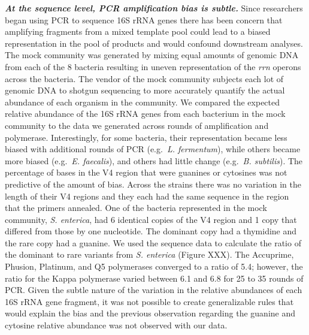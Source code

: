 \documentclass[11pt,]{article}
\begin{document}
\textbf{\emph{At the sequence level, PCR amplification bias is subtle.}}
Since researchers began using PCR to sequence 16S rRNA genes there has
been concern that amplifying fragments from a mixed template pool could
lead to a biased representation in the pool of products and would
confound downstream analyses. The mock community was generated by mixing
equal amounts of genomic DNA from each of the 8 bacteria resulting in
uneven representation of the \emph{rrn} operons across the bacteria. The
vendor of the mock community subjects each lot of genomic DNA to shotgun
sequencing to more accurately quantify the actual abundance of each
organism in the community. We compared the expected relative abundance
of the 16S rRNA genes from each bacterium in the mock community to the
data we generated across rounds of amplification and polymerase.
Interestingly, for some bacteria, their representation became less
biased with additional rounds of PCR (e.g.~\emph{L. fermentum}), while
others became more biased (e.g.~\emph{E. faecalis}), and others had
little change (e.g.~\emph{B. subtilis}). The percentage of bases in the
V4 region that were guanines or cytosines was not predictive of the
amount of bias. Across the strains there was no variation in the length
of their V4 regions and they each had the same sequence in the region
that the primers annealed. One of the bacteria represented in the mock
community, \emph{S. enterica}, had 6 identical copies of the V4 region
and 1 copy that differed from those by one nucleotide. The dominant copy
had a thymidine and the rare copy had a guanine. We used the sequence
data to calculate the ratio of the dominant to rare variants from
\emph{S. enterica} (Figure XXX). The Accuprime, Phusion, Platinum, and
Q5 polymerases converged to a ratio of 5.4; however, the ratio for the
Kappa polymerase varied between 6.1 and 6.8 for 25 to 35 rounds of PCR.
Given the subtle nature of the variation in the relative abundances of
each 16S rRNA gene fragment, it was not possible to create generalizable
rules that would explain the bias and the previous observation regarding
the guanine and cytosine relative abundance was not observed with our
data.
\end{document}
